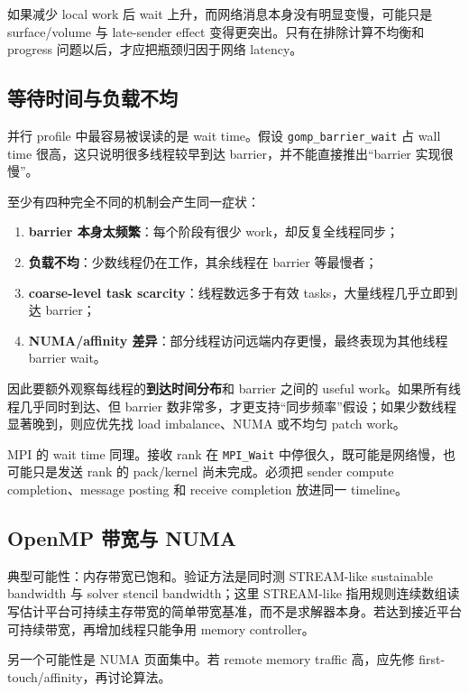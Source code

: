 如果减少 local work 后 wait 上升，而网络消息本身没有明显变慢，可能只是 surface/volume 与 late-sender effect 变得更突出。只有在排除计算不均衡和 progress 问题以后，才应把瓶颈归因于网络 latency。

\subsection{等待时间与负载不均}

并行 profile 中最容易被误读的是 wait time。假设 \texttt{gomp\_barrier\_wait} 占 wall time 很高，这只说明很多线程较早到达 barrier，并不能直接推出“barrier 实现很慢”。

至少有四种完全不同的机制会产生同一症状：

\begin{enumerate}
\item \textbf{barrier 本身太频繁}：每个阶段有很少 work，却反复全线程同步；
\item \textbf{负载不均}：少数线程仍在工作，其余线程在 barrier 等最慢者；
\item \textbf{coarse-level task scarcity}：线程数远多于有效 tasks，大量线程几乎立即到达 barrier；
\item \textbf{NUMA/affinity 差异}：部分线程访问远端内存更慢，最终表现为其他线程 barrier wait。
\end{enumerate}

因此要额外观察每线程的\textbf{到达时间分布}和 barrier 之间的 useful work。如果所有线程几乎同时到达、但 barrier 数非常多，才更支持“同步频率”假设；如果少数线程显著晚到，则应优先找 load imbalance、NUMA 或不均匀 patch work。

MPI 的 wait time 同理。接收 rank 在 \texttt{MPI\_Wait} 中停很久，既可能是网络慢，也可能只是发送 rank 的 pack/kernel 尚未完成。必须把 sender compute completion、message posting 和 receive completion 放进同一 timeline。

\subsection{OpenMP 带宽与 NUMA}

典型可能性：内存带宽已饱和。验证方法是同时测 STREAM-like sustainable bandwidth 与 solver stencil bandwidth；这里 STREAM-like 指用规则连续数组读写估计平台可持续主存带宽的简单带宽基准，而不是求解器本身。若达到接近平台可持续带宽，再增加线程只能争用 memory controller。

另一个可能性是 NUMA 页面集中。若 remote memory traffic 高，应先修 first-touch/affinity，再讨论算法。

